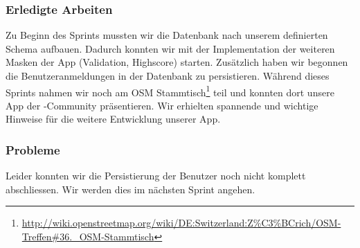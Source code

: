 \subsubsection{Erledigte Arbeiten}
Zu Beginn des Sprints mussten wir die Datenbank nach unserem definierten Schema aufbauen.
Dadurch konnten wir mit der Implementation der weiteren Masken der App (Validation, Highscore) starten.
Zusätzlich haben wir begonnen die Benutzeranmeldungen in der Datenbank zu persistieren.
Während dieses Sprints nahmen wir noch am OSM Stammtisch\footnote{\url{http://wiki.openstreetmap.org/wiki/DE:Switzerland:Z\%C3\%BCrich/OSM-Treffen\#36._OSM-Stammtisch}} teil und konnten dort unsere App der -Community präsentieren.
Wir erhielten spannende und wichtige Hinweise für die weitere Entwicklung unserer App.

\subsubsection{Probleme}
Leider konnten wir die Persistierung der Benutzer noch nicht komplett abschliessen.
Wir werden dies im nächsten Sprint angehen.